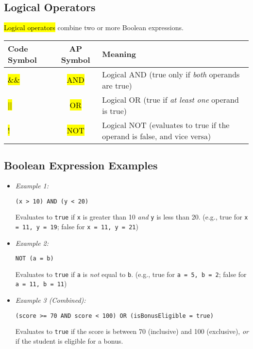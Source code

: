 \documentclass[11pt,oneside]{book}
\newcommand{\hlc}[2][hlyellow]{\sethlcolor{#1}\hl{#2}}
\begin{document}
\subsection*{Logical Operators}
\hlc[hlred]{Logical operators} combine two or more Boolean expressions.

\begin{tabularx}{\textwidth}{>{\ttfamily}l >{\ttfamily}c X}
\toprule
\textbf{Code Symbol} & \textbf{AP Symbol} & \textbf{Meaning} \\
\midrule
\hlc[hlred]{\&\&} & \hlc[hlred]{AND} & Logical AND (true only if \textit{both} operands are true) \\
\hlc[hlred]{||} & \hlc[hlred]{OR} & Logical OR (true if \textit{at least one} operand is true) \\
\hlc[hlred]{!} & \hlc[hlred]{NOT} & Logical NOT (evaluates to true if the operand is false, and vice versa) \\
\bottomrule
\end{tabularx}

\subsection*{Boolean Expression Examples}
\begin{itemize}
\item \textit{Example 1:}
\begin{lstlisting}[language={}, basicstyle=\ttfamily\small]
(x > 10) AND (y < 20)
\end{lstlisting}
Evaluates to \texttt{true} if \texttt{x} is greater than 10 \textit{and} \texttt{y} is less than 20. (e.g., true for \texttt{x = 11, y = 19}; false for \texttt{x = 11, y = 21})
\item \textit{Example 2:}
\begin{lstlisting}[language={}, basicstyle=\ttfamily\small]
NOT (a = b)
\end{lstlisting}
Evaluates to \texttt{true} if \texttt{a} is \textit{not} equal to \texttt{b}. (e.g., true for \texttt{a = 5, b = 2}; false for \texttt{a = 11, b = 11})
\item \textit{Example 3 (Combined):}
\begin{lstlisting}[language={}, basicstyle=\ttfamily\small]
(score >= 70 AND score < 100) OR (isBonusEligible = true)
\end{lstlisting}
Evaluates to \texttt{true} if the score is between 70 (inclusive) and 100 (exclusive), \textit{or} if the student is eligible for a bonus.
\end{itemize}
\end{document}
